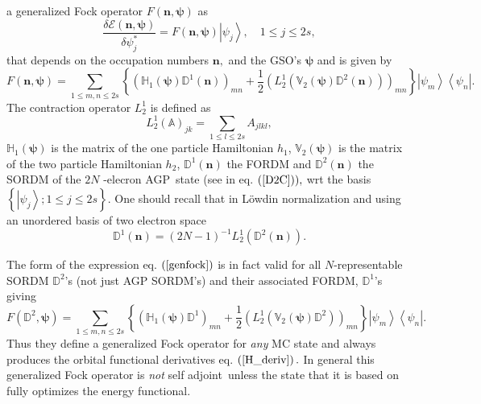 \documentclass{preprint}
\begin{document}
a generalized Fock operator $F\left( \bm{n,\psi}\right) $ as
\begin{equation}
\frac{\delta\mathcal{E}\left( \bm{n,\psi}\right) }{\delta\psi_{j}^{\ast}}%
=F\left( \bm{n,\psi}\right) \left\vert \psi_{j}\right\rangle ,\quad1\leq
j\leq2s,  \label{H_deriv}
\end{equation}
that depends on the occupation numbers $\bm{n,}$ and the GSO's $\bm{\psi}$
and is given by
\begin{equation}
F\left( \bm{n,\psi}\right) =\sum_{1\leq m,n\leq2s}\left\{ \left( \mathbb{H}%
_{1}\left( \bm{\psi}\right) \mathbb{D}^{1}\left( \bm{n}\right) \right) _{mn}+%
\frac{1}{2}\left( L_{2}^{1}\left( \mathbb{V}_{2}\left( \bm{\psi}\right)
\mathbb{D}^{2}\left( \bm{n}\right) \right) \right) _{mn}\right\} \left\vert
\psi_{m}\right\rangle \left\langle \psi _{n}\right\vert .  \label{genfock}
\end{equation}
The contraction operator $L_{2}^{1}$ is defined as
\begin{equation}
L_{2}^{1}\left( \mathbb{A}\right) _{jk}=\sum_{1\leq l\leq2s}A_{jlkl},
\end{equation}
$\mathbb{H}_{1}\left( \bm{\psi}\right) $ is the matrix of the one particle
Hamiltonian $h_{1}$, $\mathbb{V}_{2}\left( \bm{\psi}\right) $ is the matrix
of the two particle Hamiltonian $h_{2}$, $\mathbb{D}^{1}\left( \bm{n}\right)
$ the FORDM and $\mathbb{D}^{2}\left( \bm{n}\right) $ the SORDM of the $2N$%
-elecron AGP\ state (see in eq. $\left( \ref{D2C}\right) ),$ wrt the basis $%
\left\{ \left\vert \psi_{j}\right\rangle ;1\leq j\leq2s\right\} .$ One
should recall that in L\"{o}wdin normalization and using an unordered basis
of two electron space
\begin{equation}
\mathbb{D}^{1}\left( \bm{n}\right) =\left( 2N-1\right) ^{-1}L_{2}^{1}\left(
\mathbb{D}^{2}\left( \bm{n}\right) \right) .
\end{equation}

The form of the expression eq. $\left( \ref{genfock}\right) $ is in fact
valid for all $N$-representable SORDM $\mathbb{D}^{2}$'s (not just AGP
SORDM's) and their associated FORDM, $\mathbb{D}^{1}$'s giving
\begin{equation}
F\left( \mathbb{D}^{2}\bm{,\psi}\right) =\sum_{1\leq m,n\leq2s}\left\{
\left( \mathbb{H}_{1}\left( \bm{\psi}\right) \mathbb{D}^{1}\right) _{mn}+%
\frac{1}{2}\left( L_{2}^{1}\left( \mathbb{V}_{2}\left( \bm{\psi }\right)
\mathbb{D}^{2}\right) \right) _{mn}\right\} \left\vert \psi_{m}\right\rangle
\left\langle \psi_{n}\right\vert .
\end{equation}
Thus they define a generalized Fock operator for \emph{any }MC state and
always produces the orbital functional derivatives eq. $\left( \ref{H_deriv}%
\right) .$ In general this generalized Fock operator is \emph{not }self
adjoint\emph{\ }unless the state that it is based on fully optimizes the
energy functional.
\end{document}
